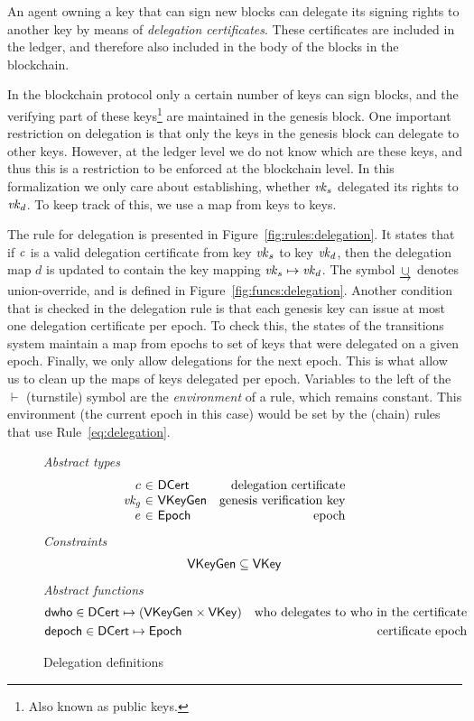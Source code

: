 \newcommand{\DCert}{\type{DCert}}
\newcommand{\DState}{\type{DState}}

An agent owning a key that can sign new blocks can delegate its signing rights
to another key by means of \textit{delegation certificates}. These certificates
are included in the ledger, and therefore also included in the body of the
blocks in the blockchain.

In the blockchain protocol only a certain number of keys can sign blocks, and
the verifying part of these keys\footnote{Also known as public keys.} are
maintained in the genesis block. One important restriction on delegation is
that only the keys in the genesis block can delegate to other keys. However, at
the ledger level we do not know which are these keys, and thus this is a
restriction to be enforced at the blockchain level. In this formalization we
only care about establishing, whether $\mathit{vk}_s$ delegated its rights to
$\mathit{vk}_d$. To keep track of this, we use a map from keys to keys.

The rule for delegation is presented in
Figure~\ref{fig:rules:delegation}. It states that if $\mathit{c}$ is a valid
delegation certificate from key $\mathit{vk}_s$ to key $\mathit{vk}_d$, then the
delegation map $d$ is updated to contain the key mapping
$\mathit{vk}_s \mapsto \mathit{vk}_d$. The symbol $\mathbin{\underrightarrow\cup}$ denotes
union-override, and is defined in Figure~\ref{fig:funcs:delegation}. Another
condition that is checked in the delegation rule is that each genesis key can
issue at most one delegation certificate per epoch. To check this, the states
of the transitions system maintain a map from epochs to set of keys that were
delegated on a given epoch. Finally, we only allow delegations for the next
epoch. This is what allow us to clean up the maps of keys delegated per epoch.
Variables to the left of the $\vdash$ (turnstile) symbol are the
\textit{environment} of a rule, which remains constant. This environment (the
current epoch in this case) would be set by the (chain) rules that use
Rule~\ref{eq:delegation}.

\begin{figure}
  \emph{Abstract types}
  \begin{equation*}
    \begin{array}{r@{~\in~}lr}
      c & \DCert & \text{delegation certificate}\\
      \var{vk_g} & \VKeyGen & \text{genesis verification key}\\
      e & \Epoch & \text{epoch}\\
    \end{array}
  \end{equation*}
  \emph{Constraints}
  \begin{align*}
    \mathsf{VKeyGen} \subseteq \mathsf{VKey}
  \end{align*}
  \emph{Abstract functions}
  \begin{align*}
    & \fun{dwho} \in \DCert \mapsto (\VKeyGen \times \VKey) & \text{who delegates to who in the certificate}\\
    & \fun{depoch} \in \DCert \mapsto \Epoch & \text{certificate epoch}
  \end{align*}
  \caption{Delegation definitions}
  \label{fig:defs:delegation}
\end{figure}

